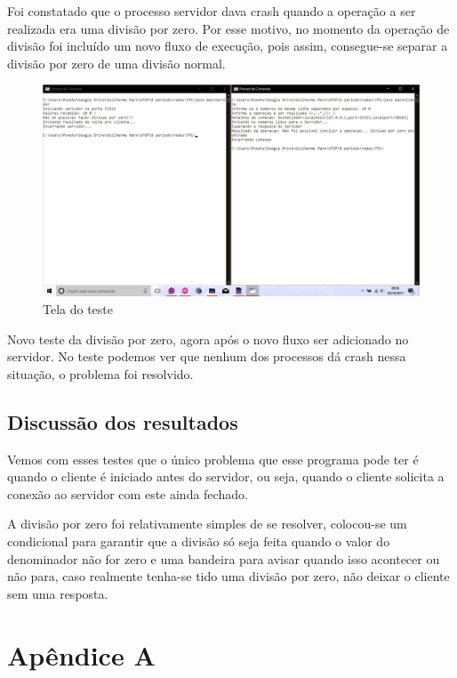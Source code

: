 \documentclass[brazil, a4paper,12pt]{article}
\begin{document}
\begin{itemize}
	Foi constatado que o processo servidor dava crash quando a operação a ser realizada era uma divisão por zero. Por esse motivo, no momento da operação de divisão foi incluído um novo fluxo de execução, pois assim, consegue-se separar a divisão por zero de uma divisão normal.
	
	\newpage
	
	\begin{figure}[ht!]
		\centering
		\includegraphics[scale=0.45]{teste8.jpg}
		\caption{Tela do teste}
		\label{Rotulo}
	\end{figure}
	
	Novo teste da divisão por zero, agora após o novo fluxo ser adicionado no servidor. No teste podemos ver que nenhum dos processos dá crash nessa situação, o problema foi resolvido.
	
	\newpage
	
\end{itemize}

\newpage		
\subsection{Discussão dos resultados}
Vemos com esses testes que o único problema que esse programa pode ter é quando o cliente é iniciado antes do servidor, ou seja, quando o cliente solicita a conexão ao servidor com este ainda fechado. 

A divisão por zero foi relativamente simples de se resolver, colocou-se um condicional para garantir que a divisão só seja feita quando o valor do denominador não for zero e uma bandeira para avisar quando isso acontecer ou não para, caso realmente tenha-se tido uma divisão por zero, não deixar o cliente sem uma resposta.

\section{Apêndice A}


\end{document}
